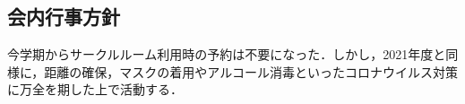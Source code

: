\subsection*{会内行事方針}


今学期からサークルルーム利用時の予約は不要になった．しかし，2021年度と同様に，距離の確保，マスクの着用やアルコール消毒といったコロナウイルス対策に万全を期した上で活動する．
